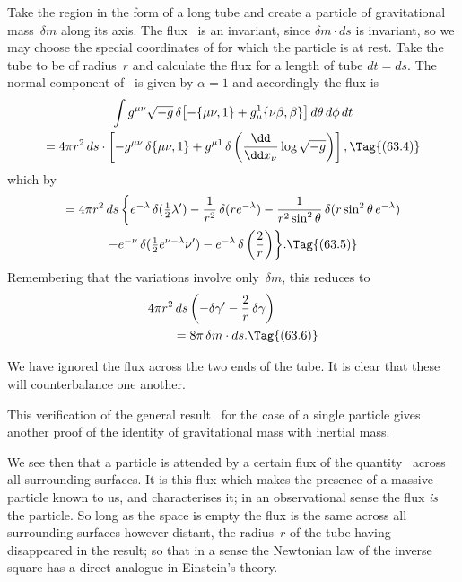 \documentclass[12pt]{book}
\begin{document}
Take the region in the form of a long tube and create a particle of gravitational
mass~$\delta m$ along its axis. The flux~ is an invariant, since $\delta m \cdot ds$
is invariant, so we may choose the special coordinates of  for which the
particle is at rest. Take the tube to be of radius~$r$ and calculate the flux for
a length of tube $dt = ds$. The normal component of~ is given by $\alpha = 1$
and accordingly the flux is
\begin{multline*}
  \int g^{\mu\nu} \sqrt{-g}\, \delta\bigl[-\{\mu\nu, 1\} + g_{\mu}^{1} \{\nu\beta, \beta\}\bigr]\, d\theta\, d\phi\, dt \\
  = 4\pi r^{2}\, ds
  \cdot \left[ -g^{\mu\nu}\, \delta\{\mu\nu, 1\} + g^{\mu1}\, \delta \left(\frac{\dd}{\dd x_{\nu}} \log \sqrt{-g}\right)\right],
  \Tag{(63.4)}
\end{multline*}
which by~
\begin{multline*}
  = 4\pi r^{2}\, ds\,
  \biggl\{e^{-\lambda}\, \delta(\tfrac{1}{2}\lambda')
  - \frac{1}{r^{2}}\, \delta(re^{-\lambda})
  - \frac{1}{r^{2} \sin^{2}\theta}\, \delta(r\sin^{2}\theta\, e^{-\lambda}) \\
  - e^{-\nu}\, \delta(\tfrac{1}{2} e^{\nu - \lambda} \nu')
  - e^{-\lambda}\, \delta\left(\frac{2}{r}\right)\biggr\}.
  \Tag{(63.5)}
\end{multline*}
Remembering that the variations involve only~$\delta m$, this reduces to
\begin{align*}
&4\pi r^{2}\, ds \left(-\delta\gamma' - \frac{2}{r}\, \delta\gamma\right) \\
  &\qquad= 8\pi\, \delta m \cdot ds.
  \Tag{(63.6)}
\end{align*}

We have ignored the flux across the two ends of the tube. It is clear
that these will counterbalance one another.

This verification of the general result~ for the case of a single particle
gives another proof of the identity of gravitational mass with inertial mass.
%
%
%

We see then that a particle is attended by a certain flux of the quantity~
across all surrounding surfaces. It is this flux which makes the presence
of a massive particle known to us, and characterises it; in an observational
sense the flux \emph{is} the particle. So long as the space is empty the flux is the
same across all surrounding surfaces however distant, the radius~$r$ of the tube
having disappeared in the result; so that in a sense the Newtonian law of
the inverse square has a direct analogue in Einstein's theory.
\end{document}
